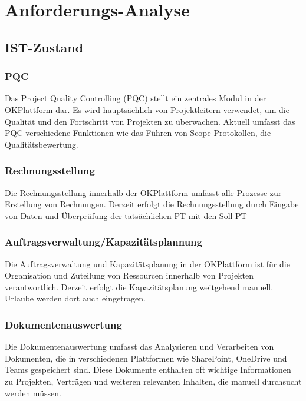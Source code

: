 \chapter{Anforderungs-Analyse}

\section{IST-Zustand}

\subsection{PQC}

Das Project Quality Controlling (PQC) stellt ein zentrales Modul in der OKPlattform dar. Es wird hauptsächlich von Projektleitern verwendet, um die Qualität und den Fortschritt von Projekten zu überwachen. Aktuell umfasst das PQC verschiedene Funktionen wie das Führen von Scope-Protokollen, die Qualitätsbewertung.

\subsection{Rechnungsstellung}

Die Rechnungsstellung innerhalb der OKPlattform umfasst alle Prozesse zur Erstellung von Rechnungen. Derzeit erfolgt die Rechnungsstellung durch Eingabe von Daten und Überprüfung der tatsächlichen PT mit den Soll-PT

\subsection{Auftragsverwaltung/Kapazitätsplannung}

Die Auftragsverwaltung und Kapazitätsplanung in der OKPlattform ist für die Organisation und Zuteilung von Ressourcen innerhalb von Projekten verantwortlich. Derzeit erfolgt die Kapazitätsplanung weitgehend manuell. Urlaube werden dort auch eingetragen.

\subsection{Dokumentenauswertung}

Die Dokumentenauswertung umfasst das Analysieren und Verarbeiten von Dokumenten, die in verschiedenen Plattformen wie SharePoint, OneDrive und Teams gespeichert sind. Diese Dokumente enthalten oft wichtige Informationen zu Projekten, Verträgen und weiteren relevanten Inhalten, die manuell durchsucht werden müssen.


